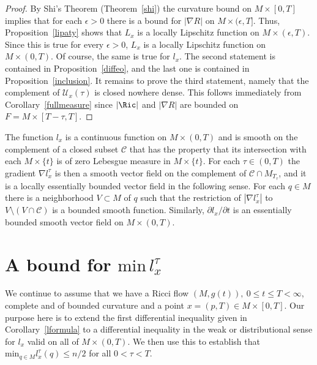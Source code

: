 \begin{proof}\sketch
{}
By Shi's Theorem (Theorem~\ref{shi}) the curvature bound on $M\times
[0,T]$ implies that for each $\epsilon>0$ there is a bound for
$|\nabla R|$ on $M\times (\epsilon,T]$. Thus,
Proposition~\ref{lipaty} shows that $L_{x}$ is a
 locally Lipschitz function on $M\times (\epsilon,T)$. Since this is
true for every $\epsilon>0$, $L_x$ is a locally Lipschitz function
on $M\times (0,T)$. Of course, the same is true for $l_{x}$. The
second statement is contained in Proposition~\ref{diffeo}, and the
last one is contained in Proposition~\ref{inclusion}. It remains to
prove the third statement, namely that the complement of ${\mathcal
U}_{x}(\tau)$ is closed nowhere dense. This follows immediately from
Corollary~\ref{fullmeasure} since $|\Ric|$ and $|\nabla R|$ are
bounded on $F=M\times [T-\tau,T]$.
\end{proof}

\begin{corollary}
\label{cor:l-continuous-ae-smooth}
The function $l_x$ is a continuous function on $M\times (0,T)$ and
is smooth on the complement of a closed subset ${\mathcal C}$ that
has the property that its intersection with each $M\times \{t\}$ is
of zero Lebesgue measure in $M\times \{t\}$. For each $\tau\in
(0,T)$ the gradient $\nabla l^\tau_x$ is then a smooth vector field
on the complement of ${\mathcal C}\cap M_{T_\tau}$, and it is a
locally essentially bounded vector field in the following sense. For
each $q\in M$ there is a neighborhood $V\subset M$ of $q$ such that
the restriction of $|\nabla l_x^\tau|$ to $V\setminus\left(V\cap
{\mathcal C}\right)$ is a bounded smooth function. Similarly,
$\partial l_x/\partial t$ is an essentially bounded smooth vector
field on $M\times (0,T)$.
\end{corollary}

\section{A bound for $\mathrm{min}\, l^\tau_x$}

We continue to assume that we have a Ricci flow $(M,g(t)),\ 0\le
t\le T<\infty$, complete and of bounded curvature and a point
$x=(p,T)\in M\times [0,T]$. Our purpose here is to extend the first
differential inequality given in
 Corollary~\ref{lformula} to a differential
inequality in the weak or distributional sense for $l_{x}$ valid on
all of $M\times (0,T)$. We then use this to establish that $\mathrm{min}_{q\in M} l^\tau_{x}(q)\le n/2$ for all $0<\tau<T$.

